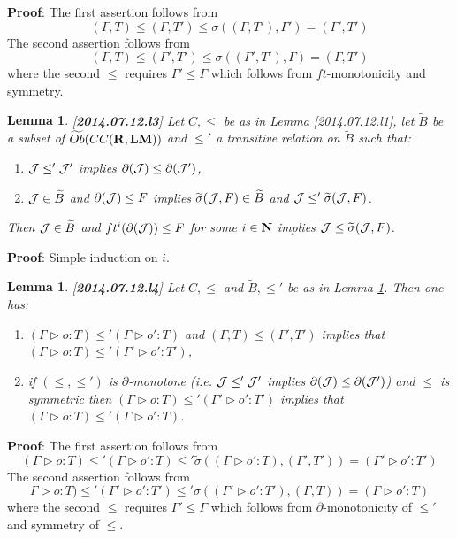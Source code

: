 \documentclass[11pt]{article}
\newenvironment{proof}{{\bf Proof}:}{\vskip 5mm }
\newtheorem{lemma}[proposition]{Lemma}
\newcommand{\llabel}[1]{\label{#1}[{\bf #1}]}
\newcommand{\nn}{{\bf N\rm}}
\newcommand{\nat}{\nn}
\newcommand{\rr}{{\bf R}}
\newcommand{\lm}{{\bf LM}}
\newcommand{\wt}{\widetilde}
\begin{document}
%
\begin{proof}
The first assertion follows from
%
$$(\Gamma,T)\le (\Gamma,T')\le \sigma((\Gamma,T'),\Gamma')=(\Gamma',T')$$
%
The second assertion  follows from
%
$$(\Gamma,T)\le (\Gamma',T')\le \sigma((\Gamma',T'),\Gamma)=(\Gamma,T')$$
%
where the second $\le$ requires $\Gamma'\le \Gamma$ which follows from $ft$-monotonicity and symmetry.
\end{proof}
%
\begin{lemma}
\llabel{2014.07.12.l3}
Let $C,\le$ be as in Lemma \ref{2014.07.12.l1}, let $\wt{B}$ be a subset of $\wt{Ob}(CC(\rr,\lm))$ and $\le'$ a transitive relation on $\wt{B}$ such that: 
%
\begin{enumerate}
\item ${\cal J}\le' {\cal J}'$ implies $\partial({\cal J})\le\partial({\cal J}')$,
\item ${\cal J}\in \wt{B}$ and $\partial({\cal J})\le F$ implies $\wt{\sigma}({\cal J},F)\in \wt{B}$ and ${\cal J}\le' \wt{\sigma}({\cal J},F)$.
\end{enumerate}
%
Then ${\cal J}\in \wt{B}$ and $ft^i(\partial({\cal J}))\le F$ for some $i\in\nat$ implies ${\cal J}\le \wt{\sigma}({\cal J},F)$. 
\end{lemma}
%
\begin{proof}
Simple induction on $i$.
\end{proof}
%
\begin{lemma}
\llabel{2014.07.12.l4}
Let $C,\le$ and $\wt{B},\le'$ be as in Lemma \ref{2014.07.12.l3}. Then one has:
%
\begin{enumerate}
\item $(\Gamma\rhd o:T)\le' (\Gamma\rhd o':T)$ and $(\Gamma,T)\le (\Gamma',T')$ implies that $(\Gamma\rhd o:T)\le' (\Gamma'\rhd o':T')$,
\item if $(\le,\le')$ is $\partial$-monotone (i.e. ${\cal J}\le' {\cal J}'$ implies $\partial({\cal J})\le \partial({\cal J}')$) and $\le$ is symmetric then $(\Gamma\rhd o:T)\le' (\Gamma'\rhd o':T')$ implies that $(\Gamma\rhd o:T)\le' (\Gamma\rhd o':T)$.
\end{enumerate}
\end{lemma}
%
\begin{proof}
The first assertion follows from
%
$$(\Gamma\rhd o:T)\le'  (\Gamma\rhd o':T)\le' \wt{\sigma}((\Gamma\rhd o':T) ,(\Gamma',T'))=(\Gamma'\rhd o':T')$$
%
The second assertion follows from
%
$$\Gamma\rhd o:T)\le' (\Gamma'\rhd o':T')\le' \sigma((\Gamma'\rhd o':T'),(\Gamma,T))=(\Gamma\rhd o':T)$$
%
where the second $\le$ requires $\Gamma'\le \Gamma$ which follows from $\partial$-monotonicity of $\le'$ and symmetry of $\le$.
\end{proof}
%
\end{document}
